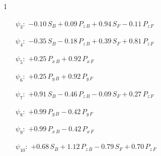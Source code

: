 \begin{questionBox}1{}
    \begin{itemize}
        \item[\(\psi_3:\)]
            \(
            -   0.10\,S_B
            +   0.09\,P_{z\,B}
            +   0.94\,S_F
            -   0.11\,P_{z\,F}
            \)
        \item[\(\psi_4:\)]
            \(
            -   0.35\,S_B
            -   0.18\,P_{z\,B}
            +   0.39\,S_F
            +   0.81\,P_{z\,F}
            \)
        \item[\(\psi_5:\)]
            \(
            +   0.25\,P_{x\,B}
            +   0.92\,P_{x\,F}
            \)
        \item[\(\psi_6:\)]
            \(
            +   0.25\,P_{y\,B}
            +   0.92\,P_{y\,F}
            \)
        \item[\(\psi_7:\)]
            \(
            +   0.91\,S_B
            -   0.46\,P_{z\,B}
            -   0.09\,S_F
            +   0.27\,P_{z\,F}
            \)
        \item[\(\psi_8:\)]
            \(
            +   0.99\,P_{y\,B}
            -   0.42\,P_{y\,F}
            \)
        \item[\(\psi_9:\)]
            \(
            +   0.99\,P_{x\,B}
            -   0.42\,P_{x\,F}
            \)
        \item[\(\psi_{10}:\)]
            \(
            +   0.68\,S_B
            +   1.12\,P_{z\,B}
            -   0.79\,S_F
            +   0.70\,P_{z\,F}
            \)
    \end{itemize}
\end{questionBox}



